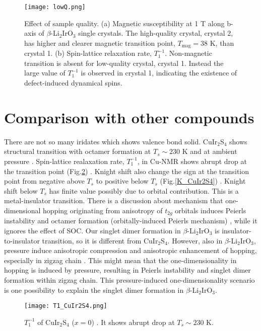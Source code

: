 \documentclass[a4,10.5pt]{report}
\begin{document}
\begin{figure}[H]
  \centering
  \texttt{[image: lowQ.png]}
  \caption{Effect of sample quality.
  (a) Magnetic susceptibility at 1 T along b-axis of $\beta$-Li$_2$IrO$_3$ single crystals.
  The high-quality crystal, crystal 2, has higher and clearer magnetic transition point, $T_\mathrm{mag} = 38$ K, than crystal 1.
  (b) Spin-lattice relaxation rate, $T^{-1}_1$.
  Non-magnetic transition is absent for low-quality crystal, crystal 1.
  Instead the large value of $T^{-1}_1$ is observed in crystal 1, indicating the existence of defect-induced dynamical spins.} 
  \label{lowQ}
\end{figure}


\section{Comparison with other compounds}
There are not so many iridates which shows valence bond solid.
CuIr$_2$S$_4$ shows structural transition with octamer formation at $T_s \sim 230$ K and at ambient pressure \cite{Radaelli2002}.
Spin-lattice realaxation rate, $T^{-1}_1$, in Cu-NMR shows abrupt drop at the transition point (Fig.\ref{T1_CuIr2S4}) \cite{Tsuji1997}.
Knight shift also change the sign at the transition point from negative above $T_s$  to positive below $T_s$ (Fig.\ref{K_CuIr2S4}) \cite{Tsuji1997}.
Knight shift below $T_s$ has finite value possibly due to orbital contribution.
This is a metal-insulator transition.
There is a discussion about mechanism that one-dimensional hopping originating from anisotropy of $t_{2g}$ orbitals induces Peierls instability and octamer formation
(orbitally-induced Peierls mechanism) \cite{Khomskii2005}, while it ignores the effect of SOC.
Our singlet dimer formation in $\beta$-Li$_2$IrO$_3$ is insulator-to-insulator transition, so it is different from CuIr$_2$S$_4$.
However, also in $\beta$-Li$_2$IrO$_3$, pressure induce anisotropic compression and anisotropic enhancement of hopping, especially in zigzag chain 
\cite{takayama2018pressure, veiga2017pressure, Kim2016}.
This might mean that the one-dimensionality in hopping is induced by pressure, resulting in Peierls instability and singlet dimer formation within zigzag chain.
This pressure-induced one-dimensionality scenario is one possibility to explain the singlet dimer formation in $\beta$-Li$_2$IrO$_3$.

\begin{figure}
  \centering
  \texttt{[image: T1\_CuIr2S4.png]}
  \caption{$T^{-1}_1$ of CuIr$_2$S$_4$ ($x = 0$) \cite{Tsuji1997}. It shows abrupt drop at $T_s \sim 230$ K.} 
  \label{T1_CuIr2S4}
\end{figure}
\end{document}
